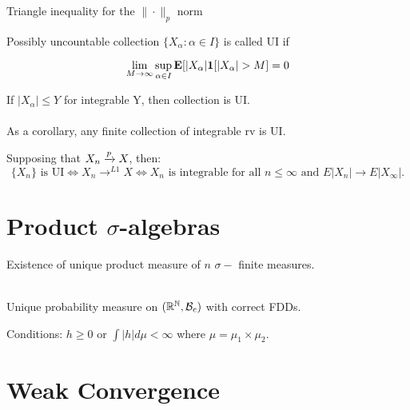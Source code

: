 \documentclass{article}
\begin{document}
\begin{theorem}[Minkowski]
Triangle inequality for the $\|\cdot \|_p $ norm
\end{theorem}

\begin{definition}
Possibly uncountable collection $\{X_\alpha: \alpha \in I\}$ is called UI if 

$$\lim_{M\to\infty} \sup_{\alpha \in I} \mathbf{E}[|X_\alpha| \boldsymbol{1}[|X_\alpha | >M] = 0$$
\end{definition}
\begin{fact}
If $|X_\alpha|\leq Y$ for integrable Y, then collection is UI. \\\\

As a corollary, any finite collection of integrable rv is UI.
\end{fact}

\begin{theorem}
Supposing that $X_n \xrightarrow{p} X$, then:
$$\{X_n\} \text{ is UI} \iff X_n \to^{L1} X \iff X_n \text{ is integrable for all } n\leq \infty \text{ and } E|X_n| \to E|X_\infty|.$$
\end{theorem}




\section{Product $\sigma$-algebras}
Existence of unique product measure of $n$ $\sigma-$ finite measures. \\\\

\begin{theorem}
Unique probability measure on $(\mathbb R^\mathbb N, \mathcal B_c)$ with correct FDDs. 
\end{theorem}



\begin{theorem}[Fubini's]
Conditions: $h\geq0$ or $\int |h| d\mu <\infty $ where $\mu = \mu_1 \times \mu_2$. 
\end{theorem}
\section{Weak Convergence}
\end{document}

